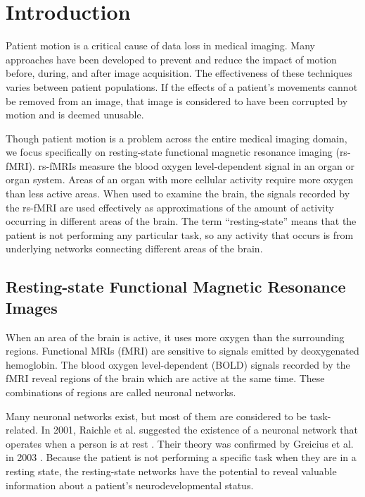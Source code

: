 \chapter{Introduction}
\label{ch:intro}

Patient motion is a critical cause of data loss in medical imaging. Many approaches have been developed to prevent and reduce the impact of motion before, during, and after image acquisition. The effectiveness of these techniques varies between patient populations. If the effects of a patient's movements cannot be removed from an image, that image is considered to have been corrupted by motion and is deemed unusable.

Though patient motion is a problem across the entire medical imaging domain, we focus specifically on resting-state functional magnetic resonance imaging (rs-fMRI). rs-fMRIs measure the blood oxygen level-dependent signal in an organ or organ system. Areas of an organ with more cellular activity require more oxygen than less active areas. When used to examine the brain, the signals recorded by the rs-fMRI are used effectively as approximations of the amount of activity occurring in different areas of the brain. The term ``resting-state'' means that the patient is not performing any particular task, so any activity that occurs is from underlying networks connecting different areas of the brain. 


\section{Resting-state Functional Magnetic Resonance Images}

When an area of the brain is active, it uses more oxygen than the surrounding regions. Functional MRIs (fMRI) are sensitive to signals emitted by deoxygenated hemoglobin. The blood oxygen level-dependent (BOLD) signals recorded by the fMRI reveal regions of the brain which are active at the same time. These combinations of regions are called neuronal networks. 

Many neuronal networks exist, but most of them are considered to be task-related. In 2001, Raichle et al. suggested the existence of a neuronal network that operates when a person is at rest \cite{Raichle2001}. Their theory was confirmed by Greicius et al. in 2003 \cite{Greicius2003}. Because the patient is not performing a specific task when they are in a resting state, the resting-state networks have the potential to reveal valuable information about a patient's neurodevelopmental status.

